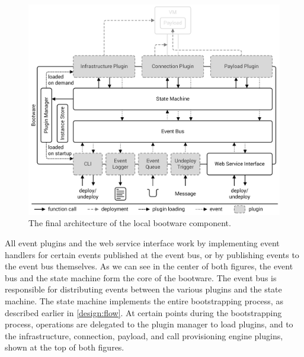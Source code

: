 \begin{figure}[!htbp]
	\centering
	\includegraphics[resolution=600]{design/assets/final_architecture_local}
	\caption{The final architecture of the local bootware component.}
	\label{image:finalarchlocal}
\end{figure}

All event plugins and the web service interface work by implementing event handlers for certain events published at the event bus, or by publishing events to the event bus themselves.
As we can see in the center of both figures, the event bus and the state machine form the core of the bootware.
The event bus is responsible for distributing events between the various plugins and the state machine.
The state machine implements the entire bootstrapping process, as described earlier in \autoref{design:flow}.
At certain points during the bootstrapping process, operations are delegated to the plugin manager to load plugins, and to the infrastructure, connection, payload, and call provisioning engine plugins, shown at the top of both figures.


